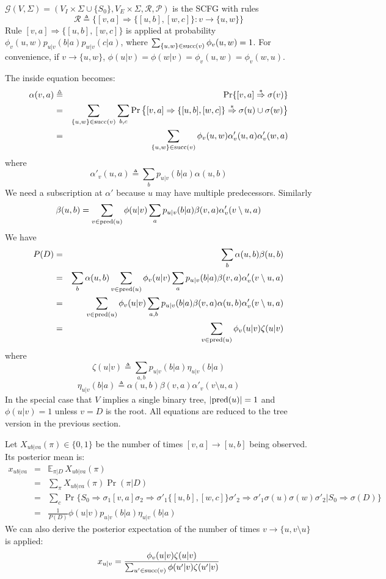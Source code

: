 \documentclass[10pt]{article}
\begin{document}
$\mathcal{G}(V,\Sigma)=(V_I\times\Sigma\cup\{S_0\},V_E\times\Sigma,\mathcal{R},\mathcal{P})$
is the SCFG with rules
$$
\mathcal{R}\triangleq\big\{[v,a]\Rightarrow\{[u,b],[w,c]\}:v\to\{u,w\}\big\}
$$
Rule $[v,a]\Rightarrow\{[u,b],[w,c]\}$ is applied at probability
$\phi_v(u,w)p_{u|v}(b|a)p_{w|v}(c|a)$, where $\sum_{\{u,w\}\in{\rm succ}(v)}\phi_v(u,w)=1$.
For convenience, if $v\to\{u,w\}$, $\phi(u|v)=\phi(w|v)=\phi_v(u,w)=\phi_v(w,u)$.

The inside equation becomes:
\begin{eqnarray*}
\alpha(v,a)&\triangleq&\Pr\{[v,a]\stackrel{*}{\Rightarrow}\sigma(v)\}\\
&=&\sum_{\{u,w\}\in{\rm succ}(v)}\sum_{b,c}\Pr\big\{[v,a]\Rightarrow\{[u,b],[w,c]\}\stackrel{*}{\Rightarrow}\sigma(u)\cup\sigma(w)\big\}\\
&=&\sum_{\{u,w\}\in{\rm succ}(v)}\phi_v(u,w)\alpha'_v(u,a)\alpha'_v(w,a)
\end{eqnarray*}
where
$$ \alpha'_v(u,a)\triangleq\sum_b p_{u|v}(b|a)\alpha(u,b) $$
We need a subscription at $\alpha'$ because $u$ may have multiple predecessors.
Similarly
$$
\beta(u,b)=\sum_{v\in{\rm pred}(u)}\phi(u|v)\sum_ap_{u|v}(b|a)\beta(v,a)\alpha'_v(v\setminus u,a)
$$
We have
\begin{eqnarray*}
P(D)&=&\sum_b\alpha(u,b)\beta(u,b)\\
&=&\sum_b\alpha(u,b)\sum_{v\in{\rm pred}(u)}\phi_v(u|v)\sum_ap_{u|v}(b|a)\beta(v,a)\alpha'_v(v\setminus u,a)\\
&=&\sum_{v\in{\rm pred}(u)}\phi_v(u|v)\sum_{a,b}p_{u|v}(b|a)\beta(v,a)\alpha(u,b)\alpha'_v(v\setminus u,a)\\
&=&\sum_{v\in{\rm pred}(u)}\phi_v(u|v)\zeta(u|v)
\end{eqnarray*}
where
$$ \zeta(u|v)\triangleq\sum_{a,b}p_{u|v}(b|a)\eta_{u|v}(b|a) $$
$$ \eta_{u|v}(b|a)\triangleq\alpha(u,b)\beta(v,a)\alpha'_v(v\setminus u,a) $$
In the special case that $V$ implies a single binary tree, $|{\rm pred}(u)|=1$
and $\phi(u|v)=1$ unless $v=D$ is the root. All equations are reduced to the
tree version in the previous section.

Let $X_{ub|va}(\pi)\in\{0,1\}$ be the number of times $[v,a]\to[u,b]$ being
observed. Its posterior mean is:
\begin{eqnarray*}
x_{ub|va}&=&\mathbb{E}_{\pi|D}\,X_{ub|va}(\pi)\\
&=&\sum_\pi X_{ub|va}(\pi)\Pr(\pi|D)\\
&=&\sum_c\Pr\{S_0\Rightarrow\sigma_1[v,a]\sigma_2\Rightarrow\sigma'_1\{[u,b],[w,c]\}\sigma'_2\Rightarrow\sigma'_1\sigma(u)\sigma(w)\sigma'_2|S_0\Rightarrow\sigma(D)\}\\
&=&\frac{1}{P(D)}\phi(u|v)p_{u|v}(b|a)\eta_{u|v}(b|a)
\end{eqnarray*}
We can also derive the posterior expectation of the number of times
$v\to\{u,v\setminus u\}$ is applied:
$$
x_{u|v}=\frac{\phi_v(u|v)\zeta(u|v)}{\sum_{u'\in{\rm succ}(v)}\phi(u'|v)\zeta(u'|v)}
$$
\end{document}
